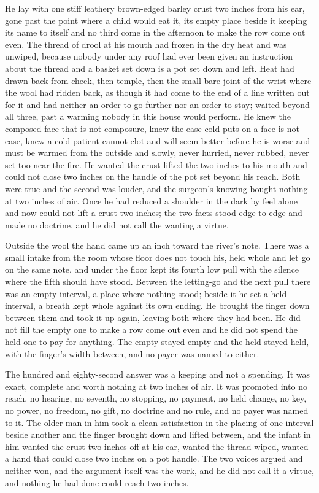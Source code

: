He lay with one stiff leathery brown-edged barley crust two inches from his ear, gone past the point where a child would eat it, its empty place beside it keeping its name to itself and no third come in the afternoon to make the row come out even. The thread of drool at his mouth had frozen in the dry heat and was unwiped, because nobody under any roof had ever been given an instruction about the thread and a basket set down is a pot set down and left. Heat had drawn back from cheek, then temple, then the small bare joint of the wrist where the wool had ridden back, as though it had come to the end of a line written out for it and had neither an order to go further nor an order to stay;  waited beyond all three, past a warming nobody in this house would perform. He knew the composed face that is not composure, knew the ease cold puts on a face is not ease, knew a cold patient cannot clot and will seem better before he is worse and must be warmed from the outside and slowly, never hurried, never rubbed, never set too near the fire. He wanted the crust lifted the two inches to his mouth and could not close two inches on the handle of the pot set beyond his reach. Both were true and the second was louder, and the surgeon's knowing bought nothing at two inches of air. Once he had reduced a shoulder in the dark by feel alone and now could not lift a crust two inches; the two facts stood edge to edge and made no doctrine, and he did not call the wanting a virtue.

Outside the wool the hand came up an inch toward the river's note. There was a small intake from the room whose floor does not touch his, held whole and let go on the same note, and under the floor  kept its fourth low pull with the silence where the fifth should have stood. Between the letting-go and the next pull there was an empty interval, a place where nothing stood; beside it he set a held interval, a breath kept whole against its own ending. He brought the finger down between them and took it up again, leaving both where they had been. He did not fill the empty one to make a row come out even and he did not spend the held one to pay for anything. The empty stayed empty and the held stayed held, with the finger's width between, and no payer was named to either.

The hundred and eighty-second answer was a keeping and not a spending. It was exact, complete and worth nothing at two inches of air. It was promoted into no reach, no hearing, no seventh, no stopping, no payment, no held change, no key, no power, no freedom, no gift, no doctrine and no rule, and no payer was named to it. The older man in him took a clean satisfaction in the placing of one interval beside another and the finger brought down and lifted between, and the infant in him wanted the crust two inches off at his ear, wanted the thread wiped, wanted a hand that could close two inches on a pot handle. The two voices argued and neither won, and the argument itself was the work, and he did not call it a virtue, and nothing he had done could reach two inches.


